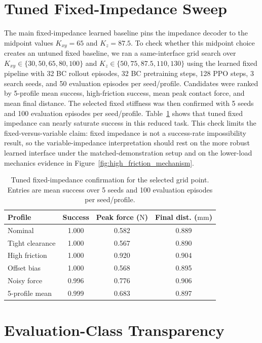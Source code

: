 ﻿\documentclass[11pt]{article}
\newcommand{\mm}{\ensuremath{\mathrm{mm}}}
\newcommand{\N}{\ensuremath{\mathrm{N}}}
\begin{document}
\section{Tuned Fixed-Impedance Sweep}
\label{app:tuned-fixed}

The main fixed-impedance learned baseline pins the impedance decoder to the midpoint values
$K_{xy}=65$ and $K_z=87.5$. To check whether this midpoint choice creates an untuned fixed
baseline, we ran a same-interface grid search over
$K_{xy}\in\{30,50,65,80,100\}$ and $K_z\in\{50,75,87.5,110,130\}$ using the learned fixed
pipeline with 32 BC rollout episodes, 32 BC pretraining steps, 128 PPO steps, 3 search seeds, and
50 evaluation episodes per seed/profile. Candidates were ranked by 5-profile mean success,
high-friction success, mean peak contact force, and mean final distance. The selected fixed
stiffness was then confirmed with 5 seeds and 100 evaluation episodes per seed/profile.
Table~\ref{tab:tuned_fixed_sweep} shows that tuned fixed impedance can nearly saturate success in
this reduced task. This check limits the fixed-versus-variable claim: fixed impedance is not a
success-rate impossibility result, so the variable-impedance interpretation should rest on the more
robust learned interface under the matched-demonstration setup and on the lower-load mechanics
evidence in Figure~\ref{fig:high_friction_mechanism}.

\begin{table}[!htbp]
  \centering
  \small
  \caption{Tuned fixed-impedance confirmation for the selected grid point. Entries are mean success
  over 5 seeds and 100 evaluation episodes per seed/profile.}
  \label{tab:tuned_fixed_sweep}
  \begin{tabular}{lccc}
    \toprule
    Profile & Success & Peak force (\N) & Final dist. (\mm) \\
    \midrule
    Nominal & 1.000 & 0.582 & 0.889 \\
    Tight clearance & 1.000 & 0.567 & 0.890 \\
    High friction & 1.000 & 0.920 & 0.904 \\
    Offset bias & 1.000 & 0.568 & 0.895 \\
    Noisy force & 0.996 & 0.776 & 0.906 \\
    5-profile mean & 0.999 & 0.683 & 0.897 \\
    \bottomrule
  \end{tabular}
\end{table}
\FloatBarrier

\section{Evaluation-Class Transparency}
\label{app:evaluation-classes}
\end{document}
